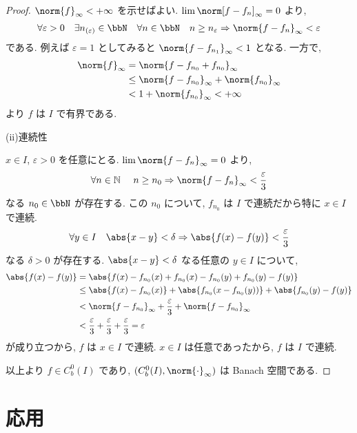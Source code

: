 \documentclass[openany, a4paper, oneside]{jsbook}
\begin{document}
\begin{proof}
$\norm{f}_{\infty} < +\infty$ を示せばよい.
$\lim \norm[f - f_n]_{\infty} = 0$ より,
\begin{align*}
 \forall \varepsilon > 0 \quad
 \exists n_{(\varepsilon)} \in \bbN \quad
 \forall n \in \bbN \quad
 n  \geq  n_{\varepsilon}
 \Rightarrow
 \norm{f - f_n}_{\infty}
 <
 \varepsilon
\end{align*}
である.
例えば $\varepsilon = 1$ としてみると $\norm{f - f_{n_{1}}}_{\infty} < 1$ となる.
一方で,
\begin{align*}
 \norm{f}_{\infty}
 &=
 \norm{f - f_{n_0} + f_{n_0}}_{\infty} \\
 &\leq
 \norm{f - f_{n_0}}_{\infty} + \norm{f_{n_0}}_{\infty} \\
 &<
 1 + \norm{f_{n_0}}_{\infty}
 <
 +\infty
\end{align*}
より $f$ は $I$ で有界である.

(ii)連続性

$x\in I$, $\varepsilon > 0$ を任意にとる.
$\lim \norm{f - f_n}_{\infty} = 0$ より,
\begin{align*}
 \forall n\in\mathbb{N}\ \quad
 n \geq n_{0}
 \Rightarrow
 \norm{f - f_n}_{\infty}
 <
 \frac{\varepsilon}{3}
\end{align*}
なる $n_0 \in \bbN$ が存在する.
この $n_0$ について, $f_{n_0}$ は $I$ で連続だから特に $x \in I$ で連続.
\begin{align*}
 \forall y \in I \quad
 \abs{x - y}
 <
 \delta
 \Rightarrow
 \abs{f(x) - f(y)}
 <
 \frac{\varepsilon}{3}
\end{align*}
なる $\delta > 0$ が存在する.
$\abs{x - y} < \delta$ なる任意の $y \in I$ について,
\begin{align*}
 \abs{f(x)-f(y)}
 &=
 \abs{f(x) - f_{n_0}(x) + f_{n_0}(x) - f_{n_0}(y) + f_{n_0}(y) - f(y)} \\
 &\leq
 \abs{f(x) - f_{n_0}(x)} + \abs{f_{n_0}(x - f_{n_0}(y))} + \abs{f_{n_0}(y) - f(y)} \\
 &<
 \norm{f - f_{n_0}}_{\infty} + \frac{\varepsilon}{3} + \norm{f - f_{n_0}}_{\infty} \\
 &<
 \frac{\varepsilon}{3} + \frac{\varepsilon}{3} + \frac{\varepsilon}{3}
 =
 \varepsilon
\end{align*}
が成り立つから, $f$ は $x \in I$ で連続.
$x \in I$ は任意であったから, $f$ は $I$ で連続.

以上より $f \in C^0_b(I)$ であり, $(C^0_b(I), \norm{\cdot}_{\infty})$ は Banach 空間である.
\end{proof}
\section{応用}
\end{document}
